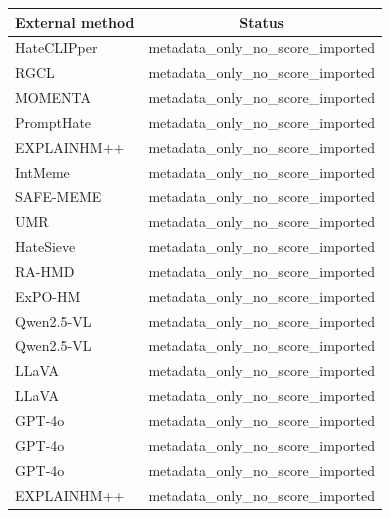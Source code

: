 \begin{tabular}{lc}
\toprule
External method & Status \\
\midrule
HateCLIPper & metadata\_only\_no\_score\_imported \\
RGCL & metadata\_only\_no\_score\_imported \\
MOMENTA & metadata\_only\_no\_score\_imported \\
PromptHate & metadata\_only\_no\_score\_imported \\
EXPLAINHM++ & metadata\_only\_no\_score\_imported \\
IntMeme & metadata\_only\_no\_score\_imported \\
SAFE-MEME & metadata\_only\_no\_score\_imported \\
UMR & metadata\_only\_no\_score\_imported \\
HateSieve & metadata\_only\_no\_score\_imported \\
RA-HMD & metadata\_only\_no\_score\_imported \\
ExPO-HM & metadata\_only\_no\_score\_imported \\
Qwen2.5-VL & metadata\_only\_no\_score\_imported \\
Qwen2.5-VL & metadata\_only\_no\_score\_imported \\
LLaVA & metadata\_only\_no\_score\_imported \\
LLaVA & metadata\_only\_no\_score\_imported \\
GPT-4o & metadata\_only\_no\_score\_imported \\
GPT-4o & metadata\_only\_no\_score\_imported \\
GPT-4o & metadata\_only\_no\_score\_imported \\
EXPLAINHM++ & metadata\_only\_no\_score\_imported \\
\bottomrule
\end{tabular}
